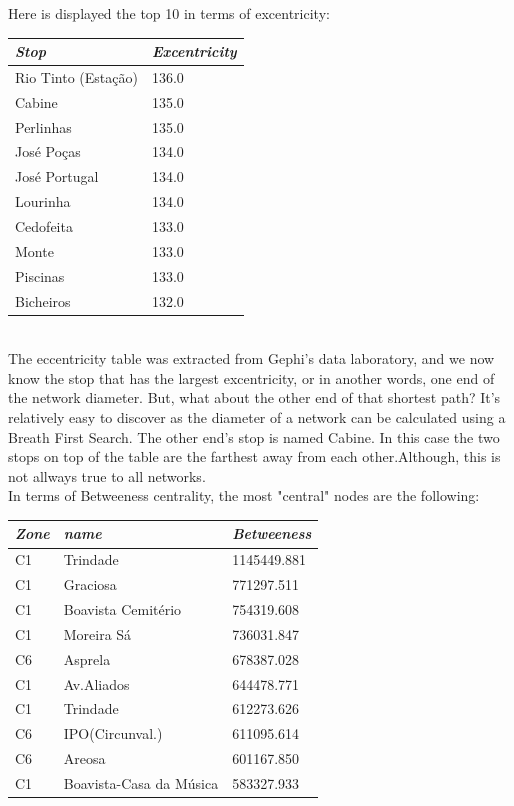 \documentclass[12pt]{article}
\begin{document}
\begin{multicols}{2}
Here is displayed the top 10 in terms of excentricity:\\
\begin{tabular}[h]{|l|l|}
\hline
\em{Stop} & \em{Excentricity}\\
\hline
Rio Tinto (Estação) & 136.0	\\
Cabine & 135.0\\
Perlinhas & 135.0\\
José Poças & 134.0\\	
José Portugal & 134.0\\
Lourinha & 134.0\\
Cedofeita & 133.0\\
Monte & 133.0\\
Piscinas & 133.0\\	
Bicheiros & 132.0\\
\hline
\end{tabular}\\
The eccentricity table was extracted from Gephi's data laboratory, and we now know the stop that has the largest excentricity, or in another words, one end of the network diameter. But, what about the other end of that shortest path? It's relatively easy to discover as the diameter of a network can be calculated using a Breath First Search. The other end's stop is named Cabine. In this case the two stops on top of the table are the farthest away from each other.Although, this is not allways true to all networks.\\
In terms of Betweeness centrality, the most "central" nodes are the following:
\begin{center}
\begin{tabular}[h]{|l|l|l|}
\hline
\em{Zone} & \em{name} & \em{Betweeness}\\
\hline
C1   & Trindade	& 1145449.881\\
C1	 & Graciosa	& 771297.511\\
C1	 & Boavista Cemitério & 754319.608\\
C1	 & Moreira Sá & 736031.847\\
C6 	 & Asprela & 678387.028\\
C1	 & Av.Aliados & 644478.771\\
C1	 & Trindade & 612273.626\\
C6	 & IPO(Circunval.)	& 611095.614\\
C6	 & Areosa	& 601167.850\\
C1	 & Boavista-Casa da Música	& 583327.933\\
\hline
\end{tabular}
\end{center}


\end{multicols}
\end{document}
